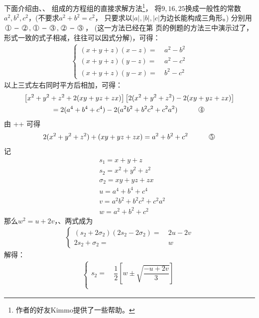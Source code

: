 \begin{enumerate}[label={【\textbf{例\thechapter.\arabic*}】},
 leftmargin=\inteval{\myenumleftmargin}pt,
 itemsep=\inteval{\myenumitempsep}pt,
 itemindent=\inteval{\myenumitemindent}pt]
下面介绍由、、
组成的方程组的直接求解方法\footnote{作者的好友Kimmo提供了一些帮助。}，
将$ 9,16,25 $换成一般性的常数$ a^2,b^2,c^2 $，(不要求$ a^2+b^2=c^2 $，
只要求以$ |a|,|b|,|c| $为边长能构成三角形。)
分别用$ \mycircled{1}-\mycircled{2},
\mycircled{1}-\mycircled{3},\mycircled{2}-\mycircled{3} $，
(这一方法已经在第\pageref{复数多元二次方程求解演示} 页的例题的方法三中演示过了，
形式一致的式子相减，往往可以因式分解)，可得：
\begin{align*}
    \left\{
    \begin{aligned}
        (x+y+z)(x-z)=&\ a^2-b^2   \\
        (x+y+z)(y-z)=&\ a^2-c^2  \\
        (x+y+z)(y-x)=&\ b^2-c^2   
    \end{aligned}
    \right.
\end{align*}
以上三式左右同时平方后相加，可得：
\begin{gather*}
    \left[ x^2+y^2+z^2+2(xy+yz+zx) \right] \left[ 2(x^2+y^2+z^2)-2(xy+yz+zx) \right] \\
    =2(a^4+b^4+c^4)-2(a^2b^2+b^2c^2+c^2a^2) \hspace{1cm} \mycircled{4}
\end{gather*}
由 ++ 可得
\begin{align*}
    2(x^2+y^2+z^2)+(xy+yz+zx)=a^2+b^2+c^2  \hspace{1cm} \mycircled{5}
\end{align*}
记
\begin{align*}
    & s_1=x+y+z \\
    & s_2=x^2+y^2+z^2 \\
    & \sigma_2=xy+yz+zx  \\
    & u=a^4+b^4+c^4 \\
    & v=a^2b^2+b^2c^2+c^2a^2 \\
    & w=a^2+b^2+c^2
\end{align*}
那么$ w^2=u+2v $，、两式成为
\begin{align*}
    \left\{
    \begin{aligned}
        (s_2+2\sigma_2)(2s_2-2\sigma_2)=&\ 2u-2v \\
        2s_2+\sigma_2 =&\ w
    \end{aligned}
    \right.
\end{align*}
解得：
\begin{align*}
    \left\{
    \begin{aligned}
        s_2 =&\  \dfrac{1}{2}\left[w \pm \sqrt{\dfrac{-u+2v}{3}}\right] \\

\end{aligned}
\end{align*}
\end{enumerate}
